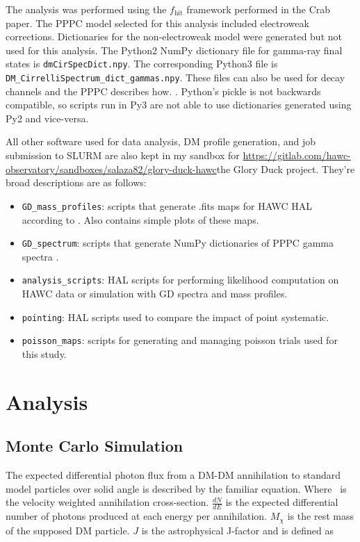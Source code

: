 The analysis was performed using the $f_{\textrm{hit}}$ framework performed in the Crab paper\cite{Abeysekara_2017}.
The PPPC model selected for this analysis included electroweak corrections.
Dictionaries for the non-electroweak model were generated but not used for this analysis.
The Python2 NumPy dictionary file for gamma-ray final states is \texttt{dmCirSpecDict.npy}.
The corresponding Python3 file is \texttt{DM\_CirrelliSpectrum\_dict\_gammas.npy}.
These files can also be used for decay channels and the PPPC describes how. \cite{Cirelli_2011}.
Python's pickle is not backwards compatible, so scripts run in Py3 are not able to use dictionaries generated using Py2 and vice-versa.

All other software used for data analysis, DM profile generation, and job submission to SLURM are also kept in my sandbox for \url{https://gitlab.com/hawc-observatory/sandboxes/salaza82/glory-duck-hawc}{the Glory Duck} project. They're broad descriptions are as follows:

\begin{itemize}
    \item \texttt{GD\_mass\_profiles}: scripts that generate .fits maps for HAWC HAL according to \cite{Geringer-Sameth:2014yza}. Also contains simple plots of these maps.
    \item \texttt{GD\_spectrum}: scripts that generate NumPy dictionaries of PPPC gamma spectra \cite{Cirelli_2011}.
    \item \texttt{analysis\_scripts}: HAL scripts for performing likelihood computation on HAWC data or simulation with GD spectra and mass profiles.
    \item \texttt{pointing}: HAL scripts used to compare the impact of point systematic.
    \item \texttt{poisson\_maps}: scripts for generating and managing poisson trials used for this study.
\end{itemize}

\section{Analysis}\label{gd_analysis}

\subsection{Monte Carlo Simulation}\label{sec:gd_mc}
The expected differential photon flux from a DM-DM annihilation to standard model
particles over solid angle is described by the familiar equation.
\iddmannilation[\gamma]
Where \sv~is the velocity weighted annihilation cross-section.
$\frac{dN}{dE}$ is the expected differential number of photons produced at each energy per annihilation.
$M_\chi$ is the rest mass of the supposed DM particle.
$J$ is the astrophysical J-factor and is defined as

